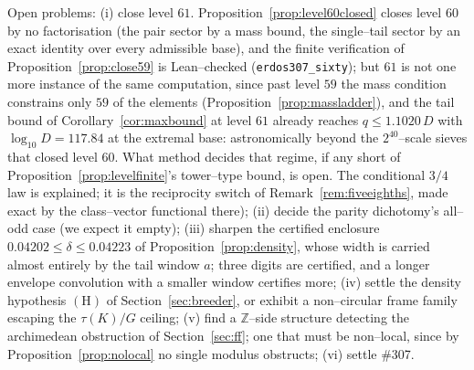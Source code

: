 \documentclass[11pt]{article}
\theoremstyle{definition}
\begin{document}
Open problems: (i) close level $61$. Proposition~\ref{prop:level60closed} closes level $60$ by no factorisation
(the pair sector by a mass bound, the single--tail sector by an exact identity over every admissible base), and the
finite verification of Proposition~\ref{prop:close59} is Lean--checked (\texttt{erdos307\_sixty}); but $61$ is not one
more instance of the same computation, since past level $59$ the mass condition constrains only $59$ of the elements
(Proposition~\ref{prop:massladder}), and the tail bound of Corollary~\ref{cor:maxbound} at level $61$ already reaches
$q\le1.1020\,D$ with $\log_{10}D=117.84$ at the extremal base: astronomically beyond the $2^{40}$--scale sieves that
closed level $60$. What method decides that regime, if any short of Proposition~\ref{prop:levelfinite}'s tower--type
bound, is open. The conditional $3/4$
law is explained; it is the reciprocity switch of Remark~\ref{rem:fiveeighths}, made exact by
the class--vector functional there); (ii) decide
the parity dichotomy's all--odd case (we expect it empty); (iii) sharpen the certified enclosure
$0.04202\le\delta\le0.04223$ of Proposition~\ref{prop:density}, whose width is carried almost
entirely by the tail window $a$; three digits are certified, and a longer envelope convolution
with a smaller window certifies more; (iv) settle the density hypothesis $(\mathrm{H})$ of
Section~\ref{sec:breeder}, or exhibit a non--circular frame family escaping the $\tau(K)/G$ ceiling;
(v) find a $\mathbb{Z}$--side structure detecting the archimedean obstruction of
Section~\ref{sec:ff}; one that must be non--local, since by Proposition~\ref{prop:nolocal} no single
modulus obstructs; (vi) settle \#307.
\end{document}
